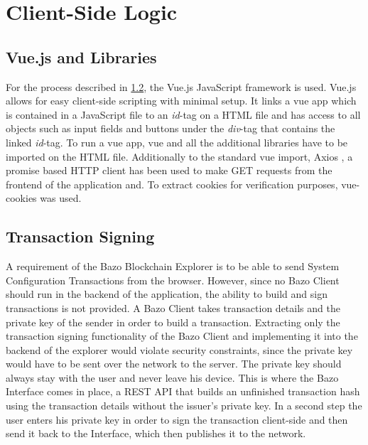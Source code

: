 \section{Client-Side Logic} \label{sec:clientside}

\subsection{Vue.js and Libraries} \label{vuejs}
For the process described in \ref{txsigning}, the Vue.js JavaScript framework \cite{vue} is used. Vue.js allows for easy client-side scripting with minimal setup. It links a vue app which is contained in a JavaScript file to an \emph{id}-tag on a HTML file and has access to all objects such as input fields and buttons under the \emph{div}-tag that contains the linked  \emph{id}-tag. To run a vue app, vue and all the additional libraries have to be imported on the HTML file. Additionally to the standard vue import, Axios , a promise based HTTP client \cite{axios} has been used to make GET requests from the frontend of the application and. To extract cookies for verification purposes, vue-cookies \cite{vcookies} was used. 

\subsection{Transaction Signing} \label{txsigning}
A requirement of the Bazo Blockchain Explorer is to be able to send System Configuration Transactions from the browser. 
However, since no Bazo Client should run in the backend of the application, the ability to build and sign transactions is not provided. A Bazo Client takes transaction details and the private key of the sender in order to build a transaction. Extracting only the transaction signing functionality of the Bazo Client and implementing it into the backend of the explorer would violate security constraints, since the private key would have to be sent over the network to the server. The private key should always stay with the user and never leave his device. This is where the Bazo Interface \cite{marc} comes in place, a REST API that builds an unfinished transaction hash using the transaction details without the issuer's private key. In a second step the user enters his private key in order to sign the transaction client-side and then send it back to the Interface, which then publishes it to the network.

